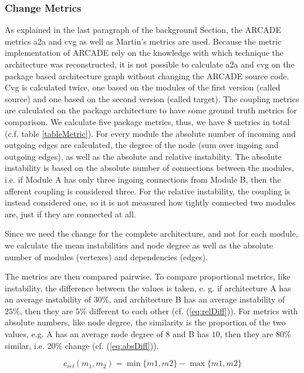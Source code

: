 \documentclass[conference]{IEEEtran}
\begin{document}
\subsubsection{Change Metrics}

As explained in the last paragraph of the background Section, the ARCADE metrics a2a and cvg as well as Martin's metrics are used. Because the metric implementation of ARCADE rely on the knowledge with which technique the architecture was reconstructed, it is not possible to calculate a2a and cvg on the package based architecture graph without changing the ARCADE source code. Cvg is calculated twice, one based on the modules of the first version (called source) and one based on the second version (called target).
The coupling metrics are calculated on the package architecture to have some ground truth metrics for comparison. We calculate five package metrics, thus, we have 8 metrics in total (c.f. table \ref{tableMetric}).
For every module the absolute number of incoming and outgoing edges are calculated, the degree of the node (sum over ingoing and outgoing edges), as well as the absolute and relative instability. The absolute instability is based on the absolute number of connections between the modules, i.e. if Module A has only three ingoing connections from Module B, then the afferent coupling is considered three. For the relative instability, the coupling is instead considered one, so it is not measured how tightly connected two modules are, just if they are connected at all.

Since we need the change for the complete architecture, and not for each module, we calculate the mean instabilities and node degree as well as the absolute number of modules (vertexes) and dependencies (edges).

The metrics are then compared pairwise. To compare proportional metrics, like instability, the difference between the values is taken, e. g. if architecture A has an average instability of $30\%$, and architecture B has an average instability of $25\%$, then they are $5\%$ different to each other (cf. (\ref{eq:relDiff})). For metrics with absolute numbers, like node degree, the similarity is the proportion of the two values, e.g. A has an average node degree of $8$ and B has $10$, then they are $80\%$ similar, i.e. $20\%$ change (cf. (\ref{eq:absDiff})).

\begin{equation} \label{eq:relDiff}
c_{rel}(m_1, m_2) =  \min\{m1, m2\} - \max\{m1, m2\}
\end{equation} 
\end{document}

